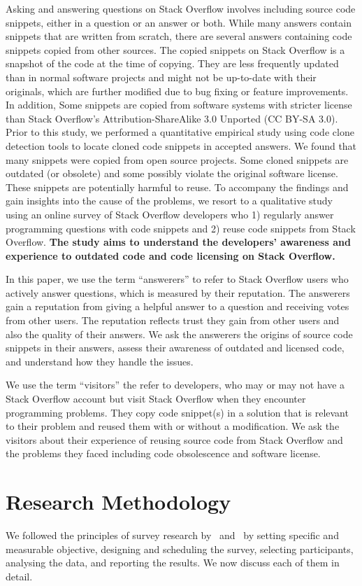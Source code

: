 \documentclass{svjour3}                     %
\begin{document}
Asking and answering questions on Stack Overflow involves including source code
snippets, either in a question or an answer or both. While many answers contain
snippets that are written from scratch, there are several answers containing
code snippets copied from other sources. The copied snippets on Stack Overflow
is a snapshot of the code at the time of copying. They are less frequently
updated than in normal software projects and might not be up-to-date with their
originals, which are further modified due to bug fixing or feature improvements.
In addition, Some snippets are copied from software systems with stricter
license than Stack Overflow's Attribution-ShareAlike 3.0 Unported (CC BY-SA
3.0). Prior to this study, we performed a quantitative empirical study using
code clone detection tools to locate cloned code snippets in accepted answers.
We found that many snippets were copied from open source projects. Some cloned
snippets are outdated (or obsolete) and some possibly violate the original software license.
These snippets are potentially harmful to reuse. To accompany the findings and
gain insights into the cause of the problems, we resort to a qualitative study
using an online survey of Stack Overflow developers who 1) regularly answer
programming questions with code snippets and 2) reuse code snippets from Stack
Overflow. \textbf{The study aims to understand the developers' awareness and
	experience to outdated code and code licensing on Stack
	Overflow.} 

In this paper, we use the term ``answerers'' to refer to Stack Overflow users
who actively answer questions, which is measured by their reputation. The
answerers gain a reputation from giving a helpful answer to a question and
receiving votes from other users. The reputation reflects trust they gain from
other users and also the quality of their answers. We ask the answerers the
origins of source code snippets in their answers, assess their awareness of
outdated and licensed code, and understand how they handle the issues.

We use the term ``visitors'' the refer to developers, who may or may not have a
Stack Overflow account but visit Stack Overflow when they encounter programming
problems. They copy code snippet(s) in a solution that is relevant to their
problem and reused them with or without a modification. We ask the visitors
about their experience of reusing source code from Stack Overflow and the problems
they faced including code obsolescence and software license.

\section{Research Methodology}
We followed the principles of survey research by~\cite{Pfleeger2001}
and~\cite{Kitchenham2002} by setting specific and measurable objective, 
designing and scheduling the survey, selecting participants, analysing the data, and reporting the results.
We now discuss each of them in detail.
\end{document}
